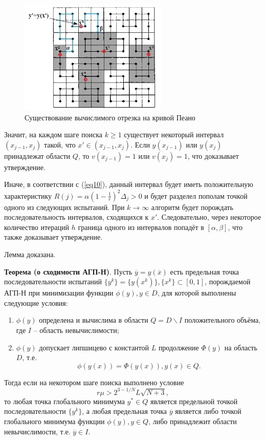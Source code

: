 \documentclass[10pt,a4paper]{book}
\begin{document}
\begin{figure}[h]
\includegraphics[width=200pt]{pic/fig_1.jpg}
\caption{Существование вычислимого отрезка на кривой Пеано} \label{fig_1}
\end{figure}

Значит, на каждом шаге поиска $k \geq 1$ существует некоторый интервал $(x_{j-1}, x_{j})$ такой, что $x' \in (x_{j-1}, x_{j})$. Если $y(x_{j-1})$ или $y(x_{j})$ принадлежат области $Q$, то $v(x_{j-1}) = 1$ или $v(x_j) = 1$, что доказывает утверждение.

Иначе, в соответствии с (\ref{eq10}), данный интервал будет иметь положительную характеристику $R(j)=\alpha(1-\frac{1}{r})^2\Delta_j>0$ и будет разделел пополам точкой одного из следующих испытаний. При $k \to \infty$ алгоритм будет порождать последовательность интервалов, сходящихся к $x'$. Следовательно, через некоторое количество итераций $h$ граница одного из интервалов попадёт в $[\alpha, \beta]$,
что также доказывает утверждение.

Лемма доказана.


\textbf{Теорема (о сходимости АГП-Н)}. Пусть $\overline{y}=y(\overline{x})$ есть предельная точка последовательности испытаний $\{y^k\}=\{y(x^k)\}, \{x^k\} \subset [0,1]$, порождаемой АГП-Н при минимизации функции $\phi(y), y \in D$, для которой выполнены следующие условия:
\begin{enumerate}
\item{$\phi(y)$ определена и вычислима в области $Q = D \backslash I$ положительного объёма, где $I$ -- область невычислимости;}
\item{$\phi(y)$ допускает липшицево с константой $L$ продолжение $\Phi(y)$ на область $D$, т.е.
\[
\phi(y(x))=\Phi(y(x)), y(x) \in Q.
\]
}
\end{enumerate}
Тогда если на некотором шаге поиска выполнено условие
\[
r\mu > 2^{3-1/N}L\sqrt{N+3},
\]
то любая точка глобального минимума $y^* \in Q$ является предельной точкой последовательности $\{y^k\}$, а любая предельная точка $\overline{y}$ является либо точкой глобального минимума функции $\phi(y), y \in Q$, либо принадлежит области невычислимости, т.е. $\overline{y} \in I$.
\end{document}
